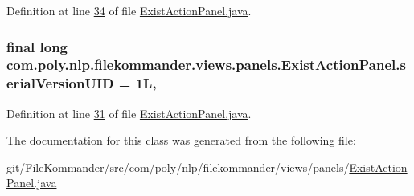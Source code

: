 Definition at line \hyperlink{L34}{34} of file \hyperlink{}{Exist\-Action\-Panel.\-java}.

\hypertarget{classcom_1_1poly_1_1nlp_1_1filekommander_1_1views_1_1panels_1_1_exist_action_panel_af73a2ecd32f1203c4025ed2a8d0651d4}{
\subsubsection[{serial\-Version\-U\-I\-D}]{\setlength{\rightskip}{0pt plus 5cm}final long com.\-poly.\-nlp.\-filekommander.\-views.\-panels.\-Exist\-Action\-Panel.\-serial\-Version\-U\-I\-D = 1\-L\hspace{0.3cm}{\ttfamily [static]}, {\ttfamily [private]}}}\label{classcom_1_1poly_1_1nlp_1_1filekommander_1_1views_1_1panels_1_1_exist_action_panel_af73a2ecd32f1203c4025ed2a8d0651d4}


Definition at line \hyperlink{L31}{31} of file \hyperlink{}{Exist\-Action\-Panel.\-java}.



The documentation for this class was generated from the following file\-:\begin{DoxyCompactItemize}
\item 
git/\-File\-Kommander/src/com/poly/nlp/filekommander/views/panels/\hyperlink{_exist_action_panel_8java}{Exist\-Action\-Panel.\-java}\end{DoxyCompactItemize}
